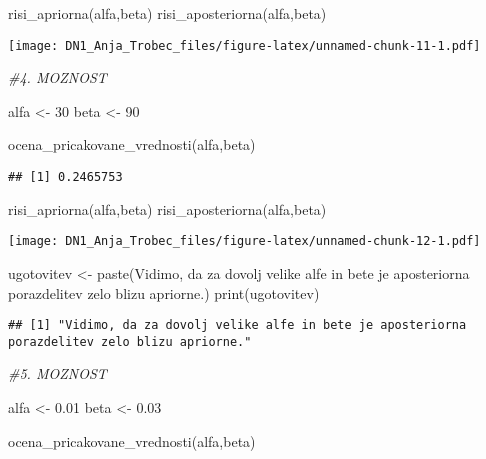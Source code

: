 \documentclass[
]{article}
\newenvironment{Shaded}{\begin{snugshade}}{\end{snugshade}}
\newcommand{\CommentTok}[1]{\textcolor[rgb]{0.56,0.35,0.01}{\textit{#1}}}
\newcommand{\DecValTok}[1]{\textcolor[rgb]{0.00,0.00,0.81}{#1}}
\newcommand{\FloatTok}[1]{\textcolor[rgb]{0.00,0.00,0.81}{#1}}
\newcommand{\FunctionTok}[1]{\textcolor[rgb]{0.00,0.00,0.00}{#1}}
\newcommand{\NormalTok}[1]{#1}
\newcommand{\OtherTok}[1]{\textcolor[rgb]{0.56,0.35,0.01}{#1}}
\newcommand{\StringTok}[1]{\textcolor[rgb]{0.31,0.60,0.02}{#1}}
\begin{document}
\begin{Shaded}
\begin{Highlighting}[]
\FunctionTok{risi\_apriorna}\NormalTok{(alfa,beta)}
\FunctionTok{risi\_aposteriorna}\NormalTok{(alfa,beta)}
\end{Highlighting}
\end{Shaded}

\texttt{[image: DN1\_Anja\_Trobec\_files/figure-latex/unnamed-chunk-11-1.pdf]}

\begin{Shaded}
\begin{Highlighting}[]
\CommentTok{\#4. MOZNOST}

\NormalTok{alfa }\OtherTok{\textless{}{-}} \DecValTok{30}
\NormalTok{beta }\OtherTok{\textless{}{-}} \DecValTok{90}


\FunctionTok{ocena\_pricakovane\_vrednosti}\NormalTok{(alfa,beta)}
\end{Highlighting}
\end{Shaded}

\begin{verbatim}
## [1] 0.2465753
\end{verbatim}

\begin{Shaded}
\begin{Highlighting}[]
\FunctionTok{risi\_apriorna}\NormalTok{(alfa,beta)}
\FunctionTok{risi\_aposteriorna}\NormalTok{(alfa,beta)}
\end{Highlighting}
\end{Shaded}

\texttt{[image: DN1\_Anja\_Trobec\_files/figure-latex/unnamed-chunk-12-1.pdf]}

\begin{Shaded}
\begin{Highlighting}[]
\NormalTok{ugotovitev }\OtherTok{\textless{}{-}} \FunctionTok{paste}\NormalTok{(}\StringTok{\textquotesingle{}Vidimo, da za dovolj velike alfe in bete je aposteriorna porazdelitev zelo blizu apriorne.\textquotesingle{}}\NormalTok{)}
\FunctionTok{print}\NormalTok{(ugotovitev)}
\end{Highlighting}
\end{Shaded}

\begin{verbatim}
## [1] "Vidimo, da za dovolj velike alfe in bete je aposteriorna porazdelitev zelo blizu apriorne."
\end{verbatim}

\begin{Shaded}
\begin{Highlighting}[]
\CommentTok{\#5. MOZNOST}

\NormalTok{alfa }\OtherTok{\textless{}{-}} \FloatTok{0.01}
\NormalTok{beta }\OtherTok{\textless{}{-}} \FloatTok{0.03}


\FunctionTok{ocena\_pricakovane\_vrednosti}\NormalTok{(alfa,beta)}
\end{Highlighting}
\end{Shaded}
\end{document}
